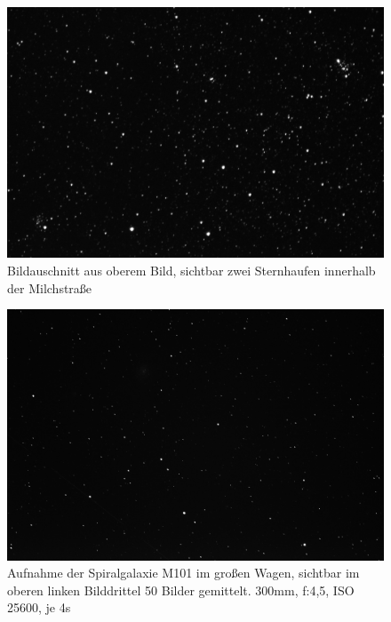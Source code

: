 \begin{figure}
\centering
\includegraphics[width=\textwidth]{figs/astro/Haufen_crop1.jpg}
\caption{Bildauschnitt aus oberem Bild, sichtbar zwei Sternhaufen innerhalb der Milchstraße}
\end{figure}


\begin{figure}
\centering
\includegraphics[width=\textwidth]{figs/astro/m101_add_50.jpg}
\caption{Aufnahme der Spiralgalaxie M101 im großen Wagen, sichtbar im oberen linken Bilddrittel 50 Bilder gemittelt. 300mm, f:4,5, ISO 25600, je 4s}
\end{figure}


